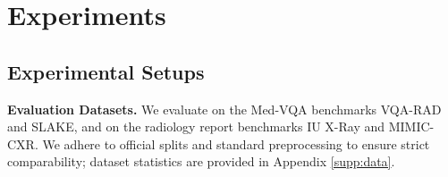 \section{Experiments}
\label{sec:exp}

\subsection{Experimental Setups}
\noindent\textbf{Evaluation Datasets.}
We evaluate on the Med-VQA benchmarks VQA-RAD\cite{lau2018dataset} and SLAKE\cite{liu2021slake}, and on the radiology report benchmarks IU X-Ray\cite{demner2015preparing} and MIMIC-CXR\cite{johnson2019mimic}. We adhere to official splits and standard preprocessing to ensure strict comparability; dataset statistics are provided in Appendix \ref{supp:data}.

